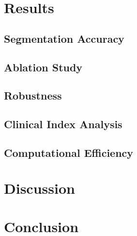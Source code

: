 \documentclass[journal]{IEEEtran}
\begin{document}
\section{Results}
\subsection{Segmentation Accuracy}
\subsection{Ablation Study}
\subsection{Robustness}
\subsection{Clinical Index Analysis}
\subsection{Computational Efficiency}

\section{Discussion}

\section{Conclusion}



\end{document}
